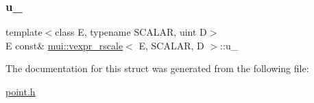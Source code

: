 \subsubsection{\texorpdfstring{u\+\_\+}{u\_}}
{\footnotesize\ttfamily template$<$class E, typename S\+C\+A\+L\+AR, uint D$>$ \\
E const\& \hyperlink{structmui_1_1vexpr__rscale}{mui\+::vexpr\+\_\+rscale}$<$ E, S\+C\+A\+L\+AR, D $>$\+::u\+\_\+\hspace{0.3cm}{\ttfamily [protected]}}



The documentation for this struct was generated from the following file\+:\begin{DoxyCompactItemize}
\item 
\hyperlink{point_8h}{point.\+h}\end{DoxyCompactItemize}
